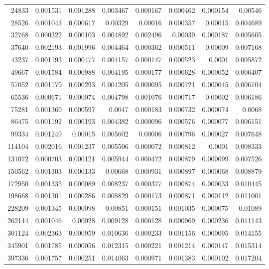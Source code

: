 \begin{longtable}{r r r r r r r r}
24833 & 0.001531 & 0.001288 & 0.003467 & 0.000167 & 0.000462 & 0.000154 & 0.00546 \\
28526 & 0.001043 & 0.000617 & 0.00329 & 0.00016 & 0.000357 & 0.00015 & 0.004689 \\
32768 & 0.000322 & 0.000103 & 0.004892 & 0.002496 & 0.00039 & 0.000187 & 0.005605 \\
37640 & 0.002193 & 0.001996 & 0.004464 & 0.000362 & 0.000511 & 0.00009 & 0.007168 \\
43237 & 0.001193 & 0.000477 & 0.004157 & 0.000147 & 0.000523 & 0.0001 & 0.005872 \\
49667 & 0.001584 & 0.000988 & 0.004195 & 0.000177 & 0.000628 & 0.000052 & 0.006407 \\
57052 & 0.001179 & 0.000293 & 0.004205 & 0.000095 & 0.000721 & 0.000045 & 0.006104 \\
65536 & 0.000671 & 0.000074 & 0.004798 & 0.001076 & 0.000717 & 0.00002 & 0.006186 \\
75281 & 0.001369 & 0.000597 & 0.0047 & 0.000183 & 0.000732 & 0.000074 & 0.0068 \\
86475 & 0.001192 & 0.000193 & 0.004382 & 0.000096 & 0.000576 & 0.000077 & 0.006151 \\
99334 & 0.001249 & 0.00015 & 0.005602 & 0.00006 & 0.000796 & 0.000027 & 0.007648 \\
114104 & 0.002016 & 0.001237 & 0.005506 & 0.000072 & 0.000812 & 0.0001 & 0.008333 \\
131072 & 0.000703 & 0.000121 & 0.005944 & 0.000472 & 0.000879 & 0.000099 & 0.007526 \\
150562 & 0.001303 & 0.000133 & 0.00668 & 0.000931 & 0.000897 & 0.000068 & 0.008879 \\
172950 & 0.001335 & 0.000089 & 0.008237 & 0.000377 & 0.000874 & 0.000033 & 0.010445 \\
198668 & 0.001301 & 0.000286 & 0.008829 & 0.000173 & 0.000871 & 0.000112 & 0.011001 \\
228209 & 0.001345 & 0.000098 & 0.00851 & 0.000151 & 0.001035 & 0.000075 & 0.01089 \\
262144 & 0.001046 & 0.00028 & 0.009128 & 0.000128 & 0.000969 & 0.000236 & 0.011143 \\
301124 & 0.002363 & 0.000959 & 0.010636 & 0.000233 & 0.001156 & 0.000095 & 0.014155 \\
345901 & 0.001785 & 0.000056 & 0.012315 & 0.000221 & 0.001214 & 0.000147 & 0.015314 \\
397336 & 0.001757 & 0.000251 & 0.014063 & 0.000971 & 0.001383 & 0.000102 & 0.017204 \\

\end{longtable}
